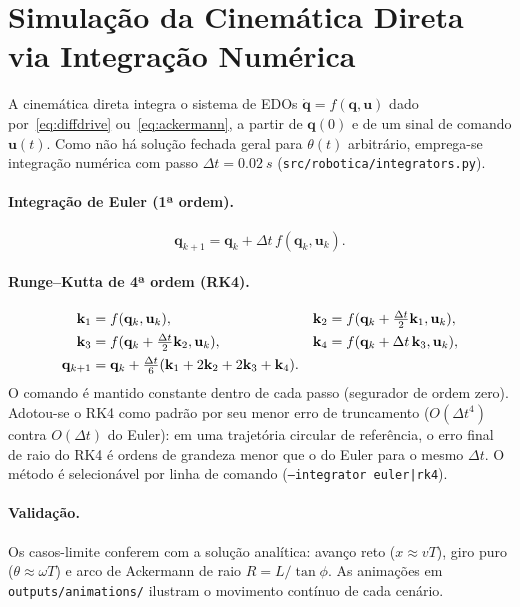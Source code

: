\documentclass[11pt,a4paper]{article}
\begin{document}
\section{Simulação da Cinemática Direta via Integração Numérica}

A cinemática direta integra o sistema de EDOs
$\dot{\mathbf{q}} = f(\mathbf{q},\mathbf{u})$ dado por~\eqref{eq:diffdrive}
ou~\eqref{eq:ackermann}, a partir de $\mathbf{q}(0)$ e de um sinal de
comando $\mathbf{u}(t)$. Como não há solução fechada geral para
$\theta(t)$ arbitrário, emprega-se integração numérica com passo
$\Delta t = \SI{0.02}{s}$ (\texttt{src/robotica/integrators.py}).

\paragraph{Integração de Euler (1ª ordem).}
\begin{equation}
  \mathbf{q}_{k+1} = \mathbf{q}_k + \Delta t\, f(\mathbf{q}_k,\mathbf{u}_k).
\end{equation}

\paragraph{Runge--Kutta de 4ª ordem (RK4).}
\begin{align}
  \mathbf{k}_1 &= f(\mathbf{q}_k,\mathbf{u}_k), &
  \mathbf{k}_2 &= f(\mathbf{q}_k + \tfrac{\Delta t}{2}\mathbf{k}_1,\mathbf{u}_k),\notag\\
  \mathbf{k}_3 &= f(\mathbf{q}_k + \tfrac{\Delta t}{2}\mathbf{k}_2,\mathbf{u}_k), &
  \mathbf{k}_4 &= f(\mathbf{q}_k + \Delta t\,\mathbf{k}_3,\mathbf{u}_k),\notag\\
  \mathbf{q}_{k+1} &= \mathbf{q}_k + \tfrac{\Delta t}{6}
    (\mathbf{k}_1 + 2\mathbf{k}_2 + 2\mathbf{k}_3 + \mathbf{k}_4). &&
\end{align}
O comando é mantido constante dentro de cada passo (segurador de ordem
zero). Adotou-se o RK4 como padrão por seu menor erro de truncamento
($O(\Delta t^4)$ contra $O(\Delta t)$ do Euler): em uma trajetória
circular de referência, o erro final de raio do RK4 é ordens de grandeza
menor que o do Euler para o mesmo $\Delta t$. O método é selecionável
por linha de comando (\texttt{--integrator euler|rk4}).

\paragraph{Validação.} Os casos-limite conferem com a solução analítica:
avanço reto ($x\approx vT$), giro puro ($\theta\approx\omega T$) e arco de
Ackermann de raio $R=L/\tan\phi$. As animações em
\texttt{outputs/animations/} ilustram o movimento contínuo de cada cenário.
\end{document}
